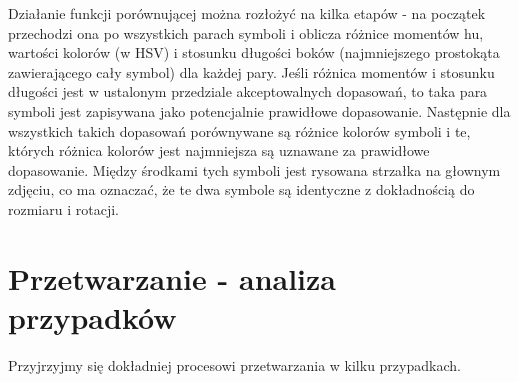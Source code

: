 \documentclass[10pt,a4paper]{article}
\begin{document}
Działanie funkcji porównującej można rozłożyć na kilka etapów - na początek przechodzi ona po wszystkich parach symboli i oblicza różnice momentów hu, wartości kolorów (w HSV) i stosunku długości boków (najmniejszego prostokąta zawierającego cały symbol) dla każdej pary. Jeśli różnica momentów i stosunku długości jest w ustalonym przedziale akceptowalnych dopasowań, to taka para symboli jest zapisywana jako potencjalnie prawidłowe dopasowanie. Następnie dla wszystkich takich dopasowań porównywane są różnice kolorów symboli i te, których różnica kolorów jest najmniejsza są uznawane za prawidłowe dopasowanie. Między środkami tych symboli jest rysowana strzałka na głownym zdjęciu, co ma oznaczać, że te dwa symbole są identyczne z dokładnością do rozmiaru i rotacji.

\newpage

\section{Przetwarzanie - analiza przypadków}
Przyjrzyjmy się dokładniej procesowi przetwarzania w kilku przypadkach.
\end{document}
